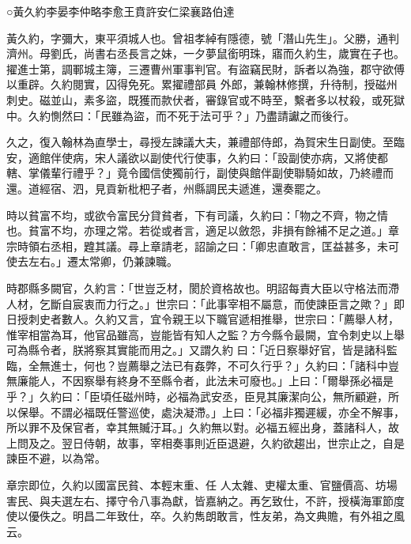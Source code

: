 
\begin{pinyinscope}

 ○黃久約李晏李仲略李愈王賁許安仁梁襄路伯達



 黃久約，字彌大，東平須城人也。曾祖孝綽有隱德，號「潛山先生」。父勝，通判濟州。母劉氏，尚書右丞長言之妹，一夕夢鼠銜明珠，寤而久約生，歲實在子也。擢進士第，調鄆城主簿，三遷曹州軍事判官。有盜竊民財，訴者以為強，郡守欲傅以重辟。久約閱實，囚得免死。累擢禮部員
 外郎，兼翰林修撰，升待制，授磁州刺史。磁並山，素多盜，既獲而款伏者，審錄官或不時至，繫者多以杖殺，或死獄中。久約惻然曰：「民雖為盜，而不死于法可乎？」乃盡請讞之而後行。



 久之，復入翰林為直學士，尋授左諫議大夫，兼禮部侍郎，為賀宋生日副使。至臨安，適館伴使病，宋人議欲以副使代行使事，久約曰：「設副使亦病，又將使都轄、掌儀輩行禮乎？」竟令國信使獨前行，副使與館伴副使聯騎如故，乃終禮而還。道經宿、泗，見貢新枇杷子者，州縣調民夫遞進，還奏罷之。



 時以貧富不均，或欲令富民分貸貧者，下有司議，久約曰：「物之不齊，物之情
 也。貧富不均，亦理之常。若從或者言，適足以斂怨，非損有餘補不足之道。」章宗時領右丞相，韙其議。尋上章請老，詔諭之曰：「卿忠直敢言，匡益甚多，未可使去左右。」遷太常卿，仍兼諫職。



 時郡縣多闕官，久約言：「世豈乏材，閡於資格故也。明詔每責大臣以守格法而滯人材，乞斷自宸衷而力行之。」世宗曰：「此事宰相不屬意，而使諫臣言之歟？」即日授刺史者數人。久約又言，宜令親王以下職官遞相推舉，世宗曰：「薦舉人材，惟宰相當為耳，他官品雖高，豈能皆有知人之監？方今縣令最闕，宜令刺史以上舉可為縣令者，朕將察其實能而用之。」又謂久約
 曰：「近日察舉好官，皆是諸科監臨，全無進士，何也？豈薦舉之法已有姦弊，不可久行乎？」久約曰：「諸科中豈無廉能人，不因察舉有終身不至縣令者，此法未可廢也。」上曰：「爾舉孫必福是乎？」久約曰：「臣頃任磁州時，必福為武安丞，臣見其廉潔向公，無所顧避，所以保舉。不謂必福既任警巡使，處決凝滯。」上曰：「必福非獨遲緩，亦全不解事，所以罪不及保官者，幸其無贓汙耳。」久約無以對。必福五經出身，蓋諸科人，故上問及之。翌日侍朝，故事，宰相奏事則近臣退避，久約欲趨出，世宗止之，自是諫臣不避，以為常。



 章宗即位，久約以國富民貧、本輕末重、任
 人太雜、吏權太重、官鹽價高、坊場害民、與夫選左右、擇守令八事為獻，皆嘉納之。再乞致仕，不許，授橫海軍節度使以優佚之。明昌二年致仕，卒。久約雋朗敢言，性友弟，為文典贍，有外祖之風云。




\end{pinyinscope}

